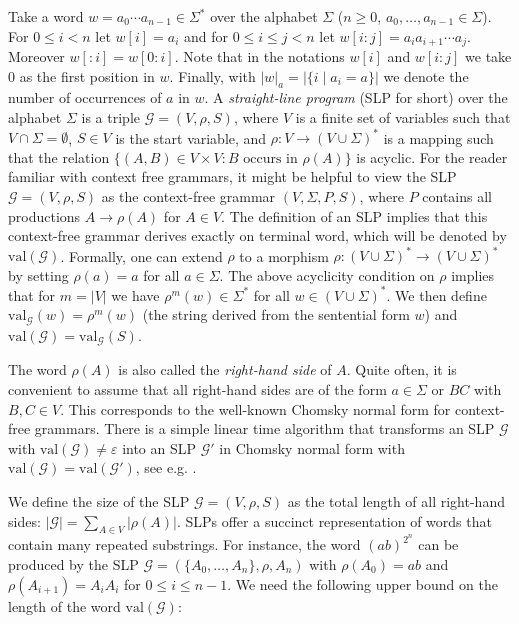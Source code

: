\documentclass[10pt,a4paper]{article}
\newcommand{\val}{\mathrm{val}}
\begin{document}
Take a word $w=a_0\cdots a_{n-1}\in\Sigma^*$ over the alphabet $\Sigma$ ($n\ge0$, $a_0,\ldots,a_{n-1}\in\Sigma$). For $0\le i<n$ let $w[i]=a_i$ and for $0\le i\le j<n$ let $w[i:j]=a_ia_{i+1}\cdots a_j$. Moreover $w[:i]=w[0:i]$. Note that in the notations $w[i]$ and $w[i:j]$ we take $0$ as the first position in $w$. Finally, with $|w|_a=|\{i\mid a_i=a\}|$ we denote the number of occurrences of $a$ in $w$.
A {\em straight-line program} (SLP for short) over the alphabet $\Sigma$ is a triple $\mathcal{G} = (V,\rho,S)$, where 
$V$ is a finite set of variables such that $V \cap \Sigma = \emptyset$, $S \in V$ is the start variable, and $\rho: V \to (V \cup \Sigma)^*$ is a mapping
such that the relation $\{ (A,B) \in V \times V \colon B \text{ occurs in } \rho(A) \}$
is acyclic. For the reader familiar with context free grammars, it might be helpful to view the SLP
$\mathcal{G} = (V,\rho,S)$ as the context-free grammar $(V,\Sigma, P, S)$, where $P$ contains all productions $A \to \rho(A)$ for $A \in V$.
The definition of an SLP implies that this context-free grammar derives exactly on terminal word, which will be denoted by
$\val(\mathcal{G})$. Formally, one can extend $\rho$ to a morphism $\rho : (V \cup \Sigma)^* \to (V \cup \Sigma)^*$ by setting
$\rho(a)=a$ for all $a \in \Sigma$. The above acyclicity condition on $\rho$ implies that for $m = |V|$ we have $\rho^m(w) \in \Sigma^*$ for all
$w \in (V \cup \Sigma)^*$. We then define $\val_{\mathcal{G}}(w) = \rho^m(w)$ (the string derived from the sentential form $w$) and 
$\val(\mathcal{G}) = \val_{\mathcal{G}}(S)$.

The word $\rho(A)$ is also called the {\em right-hand side} of $A$. 
Quite often, it is convenient to assume that all right-hand sides are of the form $a \in \Sigma$ or $BC$ with $B,C \in V$.
This corresponds to the well-known Chomsky normal form for context-free grammars. There is a simple linear time 
algorithm that transforms an SLP $\mathcal{G}$ with $\val(\mathcal{G}) \neq \varepsilon$ into an SLP $\mathcal{G}'$ in Chomsky normal
form with $\val(\mathcal{G}) = \val(\mathcal{G}')$, see e.g. \cite[Proposition 3.8]{ref38}.

We define the size of the SLP $\mathcal{G} = (V,\rho,S)$ as the total length of all right-hand sides:  $|\mathcal{G}| = \sum_{A \in V} |\rho(A)|$.
SLPs offer a succinct representation of words that contain many repeated substrings. For instance, the word $(ab)^{2^n}$ can be produced
by the SLP $\mathcal{G} = (\{A_0, \ldots,A_n\},\rho,A_n)$ with $\rho(A_0) = ab$ and $\rho(A_{i+1}) = A_i A_i$ for $0 \leq i \leq n-1$.
We need the following upper bound on the length of the word $\val(\mathcal{G})$:
\end{document}
